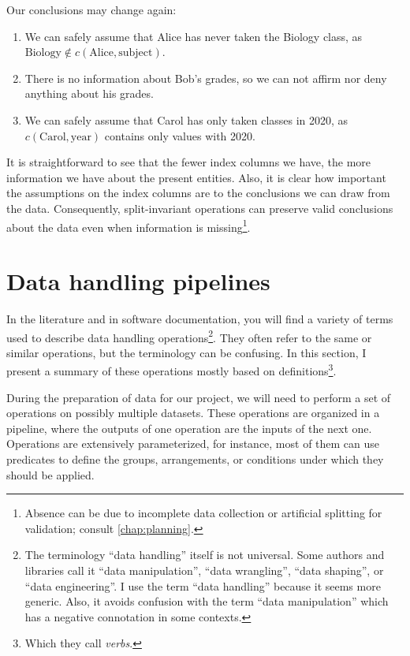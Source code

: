 Our conclusions may change again:
\begin{enumerate}
  \itemsep0em
  \item We can safely assume that Alice has never taken the Biology class, as $\text{Biology}
    \not\in c(\text{Alice}, \text{subject})$.
  \item There is no information about Bob's grades, so we can not affirm nor deny anything
    about his grades.
  \item We can safely assume that Carol has only taken classes in 2020, as $c(\text{Carol},
    \text{year})$ contains only values with 2020.
\end{enumerate}

It is straightforward to see that the fewer index columns we have, the more information we
have about the present entities.  Also, it is clear how important the assumptions on the
index columns are to the conclusions we can draw from the data. Consequently,
split-invariant operations can preserve valid conclusions about the data even when
information is missing\footnote{Absence can be due to incomplete data collection or
artificial splitting for validation; consult \cref{chap:planning}.}.

\section{Data handling pipelines}

In the literature and in software documentation, you will find a variety of terms used to
describe data handling operations\footnote{%
  The terminology ``data handling'' itself is not universal.  Some authors and libraries
  call it ``data manipulation'', ``data wrangling'', ``data shaping'', or ``data
  engineering''.  I use the term ``data handling'' because it seems more generic.
  Also, it avoids confusion with the term ``data
  manipulation'' which has a negative connotation in some contexts.}. %
They often refer to the same or similar operations, but the terminology can be confusing.
In this section, I present a summary of these operations mostly based on
\textcite{Wickham2023} definitions\footnote{Which they call \emph{verbs}.}.


During the preparation of data for our project, we will need to perform a set of operations
on possibly multiple datasets.  These operations are organized in a pipeline, where the
outputs of one operation are the inputs of the next one.
Operations are extensively parameterized, for instance, most of them can use predicates to
define the groups, arrangements, or conditions under which they should be applied.

